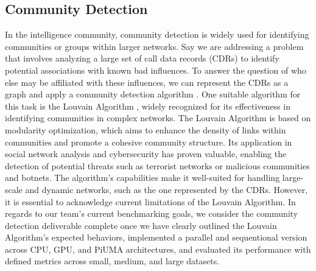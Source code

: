 \documentclass[letterpaper, 10pt]{article}
\begin{document}
\begin{multicols}{2}
{        \subsection{Community Detection}\label{section:communityDetection}
            In the intelligence community, community detection is widely used for identifying communities or groups within larger networks. 
            Say we are addressing a problem that involves analyzing a large set of call data records (CDRs) to identify potential associations with known bad influences. 
            To answer the question of who else may be affiliated with these influences, we can represent the CDRs as a graph and apply a community detection algorithm \cite{Truicua2018}. 
            One suitable algorithm for this task is the Louvain Algorithm \cite{Blondel2008}, widely recognized for its effectiveness in identifying communities in complex networks. 
            The Louvain Algorithm is based on modularity optimization, which aims to enhance the density of links within communities and promote a cohesive community structure. 
            Its application in social network analysis and cybersecurity has proven valuable, enabling the detection of potential threats such as terrorist networks or malicious communities and botnets. 
            The algorithm's capabilities make it well-suited for handling large-scale and dynamic networks, such as the one represented by the CDRs. However, it is essential to acknowledge current limitations of the Louvain Algorithm. 
             
            In regards to our team's current benchmarking goals, we consider the community detection deliverable complete once we have clearly outlined the Louvain Algorithm's expected behaviors, implemented a parallel and sequentional version across CPU, GPU, and PiUMA architectures, and evaluated its performance with defined metrics across small, medium, and large datasets.  
            
}
\end{multicols}
\end{document}
